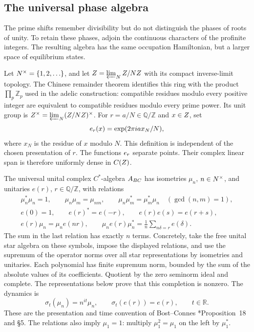 \subsection{The universal phase algebra}

The prime shifts remember divisibility but do not distinguish the phases
of roots of unity. To retain these phases, adjoin the continuous characters
of the profinite integers. The resulting algebra has the same occupation
Hamiltonian, but a larger space of equilibrium states.

Let \(N^{\times}=\{1,2,\ldots\}\), and let \(Z=\varprojlim_NZ/NZ\)
with its compact inverse-limit topology. The Chinese remainder theorem
identifies this ring with the product \(\prod_p\mathbb Z_p\) used in the
adelic construction: compatible residues modulo every positive integer
are equivalent to compatible residues modulo every prime power.
Its unit group is
\(Z^{\times}=\varprojlim_N(Z/NZ)^\times\).
For \(r=a/N\in\mathbb Q/\mathbb Z\) and \(x\in Z\), set
\[
 e_r(x)=\exp(2\pi i a x_N/N),
\]
where \(x_N\) is the residue of \(x\) modulo \(N\).
This definition is independent of the chosen presentation of \(r\).
The functions \(e_r\) separate points. Their complex linear span is
therefore uniformly dense in \(C(Z)\).

The universal unital complex \(C^*\)-algebra \(A_{BC}\) has isometries
\(\mu_n\), \(n\in N^{\times}\), and unitaries \(e(r)\),
\(r\in\mathbb Q/\mathbb Z\), with relations
\begin{equation}\label{bc:eq:relations}
\begin{gathered}
 \mu_n^*\mu_n=1,\qquad \mu_n\mu_m=\mu_{nm},\qquad
 \mu_n\mu_m^*=\mu_m^*\mu_n\quad(\gcd(n,m)=1),\\
 e(0)=1,\qquad e(r)^*=e(-r),\qquad e(r)e(s)=e(r+s),\\
 e(r)\mu_n=\mu_ne(nr),\qquad
 \mu_ne(r)\mu_n^*=\frac1n\sum_{n\delta=r}e(\delta).
\end{gathered}
\end{equation}
The sum in the last relation has exactly \(n\) terms. Concretely, take
the free unital star algebra on these symbols, impose the displayed
relations, and use the supremum of the operator norms over all star
representations by isometries and unitaries. Each polynomial has finite
supremum norm, bounded by the sum of the absolute values of its
coefficients. Quotient by the zero seminorm ideal and complete.
The representations below prove that this completion is nonzero.
The dynamics is
\begin{equation}\label{bc:eq:dynamics}
 \sigma_t(\mu_n)=n^{it}\mu_n,
 \qquad \sigma_t(e(r))=e(r),\qquad t\in\mathbb R.
\end{equation}
These are the presentation and time convention of
Bost--Connes \cite{BostConnes1995}*{Proposition~18 and \S5}.
The relations also imply \(\mu_1=1\): multiply
\(\mu_1^2=\mu_1\) on the left by \(\mu_1^*\).

